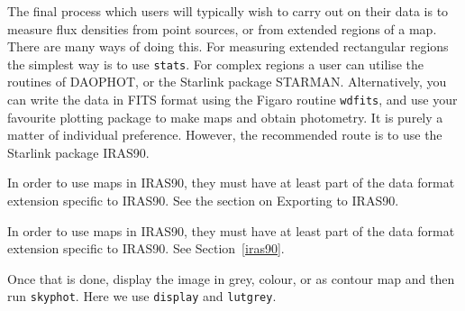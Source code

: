 \documentclass[11pt]{article}
\newenvironment{latexonly}{}{}
\newcommand{\htmlref}[2]{#1}
\newcommand{\xref}[3]{#1}
\begin{document}
   The final process which users will typically wish to carry out on
   their data is to measure flux densities from point sources, or from
   extended regions of a map. There are many ways of doing this. For
   measuring extended rectangular regions the simplest way is to use
{\tt \xref{stats}{sun95}{STATS}}.
   For complex regions a user can utilise the routines of
\xref{DAOPHOT,}{sun42}{}
   or the Starlink package
\xref{STARMAN.}{sun141}{}
   Alternatively, you can write the data in
\htmlref{FITS format}{glossfits}
   using the Figaro routine
{\tt \xref{wdfits}{sun86}{WDFITS}},
   and use your favourite plotting package to make maps and obtain
   photometry. It is purely a matter of individual preference. However,
   the recommended route is to use the Starlink package
\xref{IRAS90.}{sun163}{}

\begin{htmlonly}
   In order to use maps in IRAS90, they must have at least part
   of the data format extension specific to IRAS90. See the section on
\htmlref{Exporting to IRAS90.}{iras90}
\end{htmlonly}
\begin{latexonly}
   In order to use maps in IRAS90, they must have at least part
   of the data format extension specific to IRAS90. See
Section~\ref{iras90}.
\end{latexonly}

   Once that is done, display the image in grey, colour, or as contour
   map and then run {\tt skyphot}. Here we use
{\tt \xref{display}{sun95}{DISPLAY}}
   and
{\tt \xref{lutgrey}{sun95}{LUTGREY}}.
\end{document}
